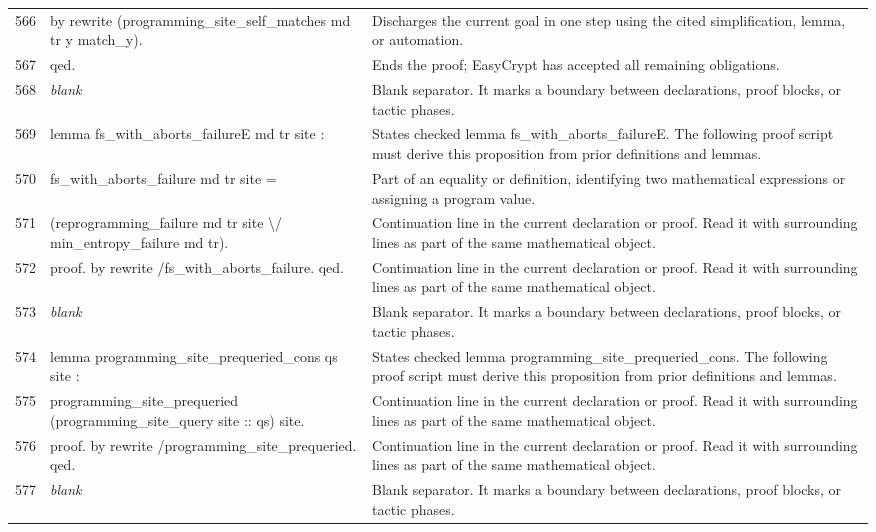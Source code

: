 \documentclass[10pt]{article}
\begin{document}
\begin{longtable}{r L{0.53\textwidth} L{0.37\textwidth}}
566 & {\ttfamily\scriptsize by rewrite (programming\_site\_self\_matches md tr y match\_y).} & Discharges the current goal in one step using the cited simplification, lemma, or automation. \\
567 & {\ttfamily\scriptsize qed.} & Ends the proof; EasyCrypt has accepted all remaining obligations. \\
568 & {\ttfamily\scriptsize \emph{blank}} & Blank separator.  It marks a boundary between declarations, proof blocks, or tactic phases. \\
569 & {\ttfamily\scriptsize lemma fs\_with\_aborts\_failureE md tr site :} & States checked lemma fs\_with\_aborts\_failureE.  The following proof script must derive this proposition from prior definitions and lemmas. \\
570 & {\ttfamily\scriptsize   fs\_with\_aborts\_failure md tr site =} & Part of an equality or definition, identifying two mathematical expressions or assigning a program value. \\
571 & {\ttfamily\scriptsize   (reprogramming\_failure md tr site \textbackslash{}/ min\_entropy\_failure md tr).} & Continuation line in the current declaration or proof.  Read it with surrounding lines as part of the same mathematical object. \\
572 & {\ttfamily\scriptsize proof. by rewrite /fs\_with\_aborts\_failure. qed.} & Continuation line in the current declaration or proof.  Read it with surrounding lines as part of the same mathematical object. \\
573 & {\ttfamily\scriptsize \emph{blank}} & Blank separator.  It marks a boundary between declarations, proof blocks, or tactic phases. \\
574 & {\ttfamily\scriptsize lemma programming\_site\_prequeried\_cons qs site :} & States checked lemma programming\_site\_prequeried\_cons.  The following proof script must derive this proposition from prior definitions and lemmas. \\
575 & {\ttfamily\scriptsize   programming\_site\_prequeried (programming\_site\_query site :: qs) site.} & Continuation line in the current declaration or proof.  Read it with surrounding lines as part of the same mathematical object. \\
576 & {\ttfamily\scriptsize proof. by rewrite /programming\_site\_prequeried. qed.} & Continuation line in the current declaration or proof.  Read it with surrounding lines as part of the same mathematical object. \\
577 & {\ttfamily\scriptsize \emph{blank}} & Blank separator.  It marks a boundary between declarations, proof blocks, or tactic phases. \\

\end{longtable}
\end{document}
